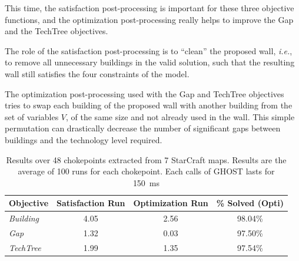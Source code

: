 \documentclass[journal]{IEEEtran}
\newcommand{\ghost}{\textsc{GHOST}\xspace}
\newcommand{\ie}{\textit{i.e.}}
\begin{document}
This  time, the  satisfaction post-processing  is important  for these
three objective functions, and the optimization post-processing really
helps to improve the Gap and the TechTree objectives.

The  role of  the  satisfaction post-processing  is  to ``clean''  the
proposed wall, \ie,  to remove all unnecessary buildings  in the valid
solution,  such  that the  resulting  wall  still satisfies  the  four
constraints of the model.

The  optimization  post-processing  used  with the  Gap  and  TechTree
objectives  tries to  swap each  building  of the  proposed wall  with
another building from  the set of variables $V$, of  the same size and
not already used in the  wall. This simple permutation can drastically
decrease  the number  of significant  gaps between  buildings and  the
technology level required.
% 
\begin{table}[ht]
\centering
\caption{Results  over 48  chokepoints  extracted  from 7  StarCraft
    maps. Results  are the  average of 100  runs for  each chokepoint.
    Each calls of \ghost lasts for 150~ms}
\label{tab:wall}
\begin{tabular}{@{}lSSS@{}} 
 \toprule 
\textbf{Objective} & \textbf{Satisfaction Run} & \textbf{Optimization Run} & \textbf{\% Solved (Opti)} \\
\midrule
{\em Building} & 4.05 & 2.56 & 98.04\% \\
{\em Gap}      & 1.32 & 0.03 & 97.50\% \\
{\em TechTree} & 1.99 & 1.35 & 97.54\% \\
\bottomrule
\end{tabular}
\end{table}
\end{document}
